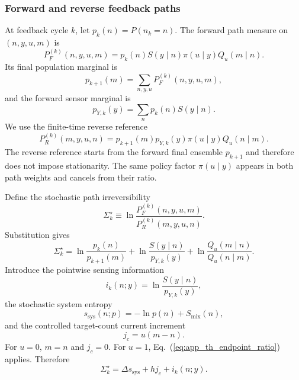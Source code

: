 \subsubsection{Forward and reverse feedback paths}

At feedback cycle $k$, let $p_k(n)=P(n_k=n)$. The forward path measure on
$(n,y,u,m)$ is
\begin{equation}
P_F^{(k)}(n,y,u,m)
=
p_k(n)S(y\mid n)\pi(u\mid y)Q_u(m\mid n).
\label{eq:app_th_forward_path}
\end{equation}
Its final population marginal is
\begin{equation}
p_{k+1}(m)
=
\sum_{n,y,u}P_F^{(k)}(n,y,u,m),
\label{eq:app_th_forward_marginal}
\end{equation}
and the forward sensor marginal is
\begin{equation}
p_{Y,k}(y)=\sum_n p_k(n)S(y\mid n).
\label{eq:app_th_sensor_marginal}
\end{equation}
We use the finite-time reverse reference
\begin{equation}
P_R^{(k)}(m,y,u,n)
=
p_{k+1}(m)p_{Y,k}(y)\pi(u\mid y)Q_u(n\mid m).
\label{eq:app_th_reverse_path}
\end{equation}
The reverse reference starts from the forward final ensemble $p_{k+1}$ and
therefore does not impose stationarity. The same policy factor
$\pi(u\mid y)$ appears in both path weights and cancels from their ratio.

Define the stochastic path irreversibility
\begin{equation}
\Sigma_k^\star
\equiv
\ln\frac{P_F^{(k)}(n,y,u,m)}{P_R^{(k)}(m,y,u,n)}.
\label{eq:app_th_path_logratio}
\end{equation}
Substitution gives
\begin{equation}
\Sigma_k^\star
=
\ln\frac{p_k(n)}{p_{k+1}(m)}
+
\ln\frac{S(y\mid n)}{p_{Y,k}(y)}
+
\ln\frac{Q_u(m\mid n)}{Q_u(n\mid m)}.
\label{eq:app_th_path_expansion}
\end{equation}
Introduce the pointwise sensing information
\begin{equation}
i_k(n;y)=\ln\frac{S(y\mid n)}{p_{Y,k}(y)},
\label{eq:app_th_pointwise_information}
\end{equation}
the stochastic system entropy
\begin{equation}
s_{\mathrm{sys}}(n;p)
=-\ln p(n)+S_{\mathrm{mix}}(n),
\label{eq:app_th_stochastic_system_entropy}
\end{equation}
and the controlled target-count current increment
\begin{equation}
j_c=u(m-n).
\label{eq:app_th_current_increment}
\end{equation}
For $u=0$, $m=n$ and $j_c=0$. For $u=1$,
Eq.~(\ref{eq:app_th_endpoint_ratio}) applies. Therefore
\begin{equation}
\boxed{
\Sigma_k^\star
=
\Delta s_{\mathrm{sys}}+h j_c+i_k(n;y).}
\label{eq:app_th_path_identity}
\end{equation}

